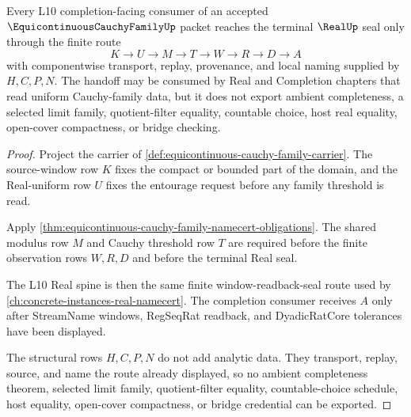 \begin{theorem}
\label{thm:equicontinuous-cauchy-family-completion-handoff}
Every L10 completion-facing consumer of an accepted $\EquicontinuousCauchyFamilyUp$ packet reaches the terminal $\RealUp$ seal only through the finite route
$$
K\longrightarrow U\longrightarrow M\longrightarrow T\longrightarrow W\longrightarrow R\longrightarrow D\longrightarrow A
$$
with componentwise transport, replay, provenance, and local naming supplied by $H,C,P,N$. The handoff may be consumed by Real and Completion chapters that read uniform Cauchy-family data, but it does not export ambient completeness, a selected limit family, quotient-filter equality, countable choice, host real equality, open-cover compactness, or bridge checking.
\end{theorem}
\begin{proof}
Project the carrier of \autoref{def:equicontinuous-cauchy-family-carrier}. The source-window row $K$ fixes the compact or bounded part of the domain, and the Real-uniform row $U$ fixes the entourage request before any family threshold is read.

Apply \autoref{thm:equicontinuous-cauchy-family-namecert-obligations}. The shared modulus row $M$ and Cauchy threshold row $T$ are required before the finite observation rows $W,R,D$ and before the terminal Real seal.

The L10 Real spine is then the same finite window-readback-seal route used by \autoref{ch:concrete-instances-real-namecert}. The completion consumer receives $A$ only after StreamName windows, RegSeqRat readback, and DyadicRatCore tolerances have been displayed.

The structural rows $H,C,P,N$ do not add analytic data. They transport, replay, source, and name the route already displayed, so no ambient completeness theorem, selected limit family, quotient-filter equality, countable-choice schedule, host equality, open-cover compactness, or bridge credential can be exported.
\end{proof}

